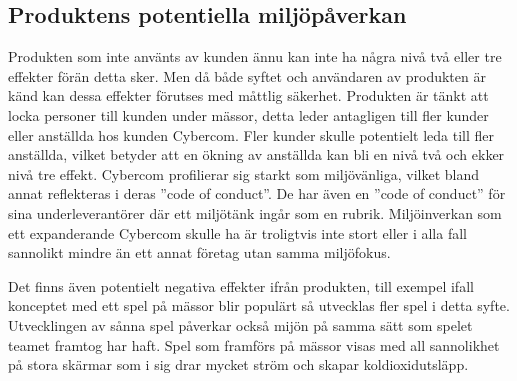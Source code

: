 \subsection{Produktens potentiella miljöpåverkan}
Produkten som inte använts av kunden ännu kan inte ha några nivå två eller tre effekter förän detta sker. Men då både syftet och användaren av produkten är känd kan dessa effekter förutses med måttlig säkerhet. Produkten är tänkt att locka personer till kunden under mässor, detta leder antagligen till fler kunder eller anställda hos kunden Cybercom. Fler kunder skulle potentielt leda till fler anställda, vilket betyder att en ökning av anställda kan bli en nivå två och ekker nivå tre effekt. Cybercom profilierar sig starkt som miljövänliga, vilket bland annat reflekteras i deras ''code of conduct''.\cite{cyber-cod} De har även en ''code of conduct'' för sina underleverantörer där ett miljötänk ingår som en rubrik.\cite{cyber-cod} Miljöinverkan som ett expanderande Cybercom skulle ha är troligtvis inte stort eller i alla fall sannolikt mindre än ett annat företag utan samma miljöfokus.

Det finns även potentielt negativa effekter ifrån produkten, till exempel ifall konceptet med ett spel på mässor blir populärt så utvecklas fler spel i detta syfte. Utvecklingen av sånna spel påverkar också mijön på samma sätt som spelet teamet framtog har haft. Spel som framförs på mässor visas med all sannolikhet på stora skärmar som i sig drar mycket ström och skapar koldioxidutsläpp.
